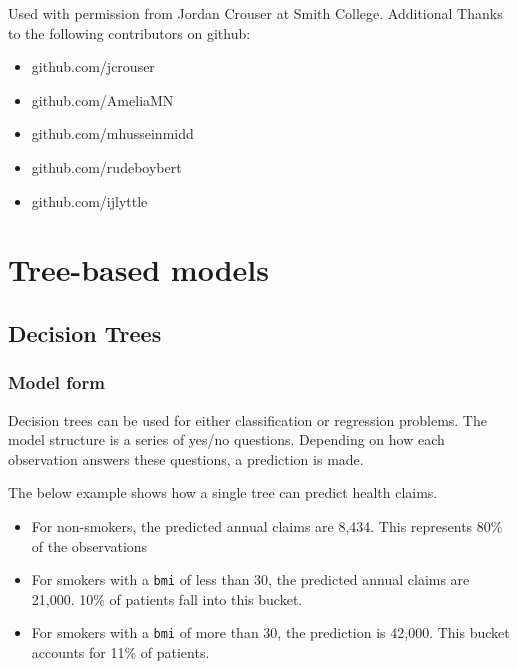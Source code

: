 \documentclass[openany]{book}
\providecommand{\tightlist}{%
  \setlength{\itemsep}{0pt}\setlength{\parskip}{0pt}}
\begin{document}
Used with permission from Jordan Crouser at Smith College. Additional Thanks to the following contributors on github:

\begin{itemize}
\tightlist
\item
  github.com/jcrouser
\item
  github.com/AmeliaMN
\item
  github.com/mhusseinmidd
\item
  github.com/rudeboybert
\item
  github.com/ijlyttle
\end{itemize}

\hypertarget{tree-based-models}{%
\chapter{Tree-based models}\label{tree-based-models}}

\hypertarget{decision-trees}{%
\section{Decision Trees}\label{decision-trees}}

\hypertarget{model-form}{%
\subsection{Model form}\label{model-form}}

Decision trees can be used for either classification or regression problems. The model structure is a series of yes/no questions. Depending on how each observation answers these questions, a prediction is made.

The below example shows how a single tree can predict health claims.

\begin{itemize}
\tightlist
\item
  For non-smokers, the predicted annual claims are 8,434. This represents 80\% of the observations
\item
  For smokers with a \texttt{bmi} of less than 30, the predicted annual claims are 21,000. 10\% of patients fall into this bucket.
\item
  For smokers with a \texttt{bmi} of more than 30, the prediction is 42,000. This bucket accounts for 11\% of patients.
\end{itemize}
\end{document}
